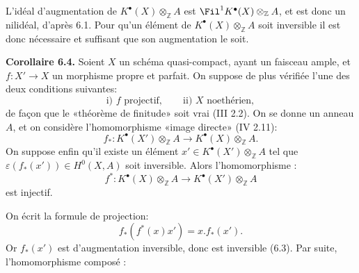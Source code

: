 L'idéal d'augmentation de $K^{\bullet}(X)\otimes_{\mathbb Z}A$ est $\Fil^1K^{\bullet}(X)\otimes_{\mathbb Z}A$, et est donc un nilidéal, d'après 6.1. Pour qu'un élément de $K^{\bullet}(X)\otimes_{\mathbb Z}A$ soit inversible il est donc nécessaire et suffisant que son augmentation le soit.

\textbf{Corollaire 6.4.} Soient $X$ un schéma quasi-compact, ayant un faisceau ample, et $f:X'\to X$ un morphisme propre et parfait. On suppose de plus vérifiée l'une des deux conditions suivantes:
\[
  \text{i) } f\text{ projectif},\qquad
  \text{ii) } X\text{ noethérien},
\]
de façon que le «théorème de finitude» soit vrai (III 2.2). On se donne un anneau $A$, et on considère l'homomorphisme «image directe» (IV 2.11):
\[
  f_*:K^{\bullet}(X')\otimes_{\mathbb Z}A\longrightarrow K^{\bullet}(X)\otimes_{\mathbb Z}A.
\]
On suppose enfin qu'il existe un élément $x'\in K^{\bullet}(X')\otimes_{\mathbb Z}A$ tel que $\varepsilon(f_*(x'))\in H^0(X,A)$ soit inversible. Alors l'homomorphisme :
\[
  f^*:K^{\bullet}(X)\otimes_{\mathbb Z}A\longrightarrow K^{\bullet}(X')\otimes_{\mathbb Z}A
\]
est injectif.

On écrit la formule de projection:
\[
  f_*(f^*(x)x')=x.f_*(x').
\]
Or $f_*(x')$ est d'augmentation inversible, donc est inversible (6.3). Par suite, l'homomorphisme composé :
